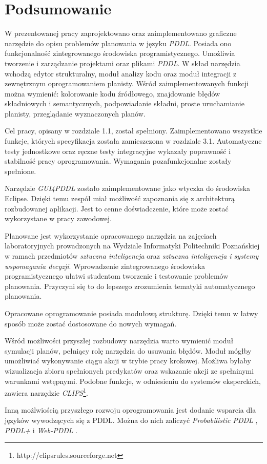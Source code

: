 \chapter{Podsumowanie}
\label{sec:podsumowanie}
W prezentowanej pracy zaprojektowano oraz zaimplementowano graficzne narzędzie do opisu problemów planowania
w języku \emph{PDDL}.
Posiada ono funkcjonalność zintegrowanego środowiska programistycznego. Umożliwia tworzenie i zarządzanie
projektami oraz plikami \emph{PDDL}. W skład narzędzia wchodzą edytor strukturalny, moduł analizy kodu oraz moduł
integracji z zewnętrznym oprogramowaniem planisty. Wśród zaimplementowanych funkcji można wymienić: kolorowanie kodu źródłowego, znajdowanie błędów składniowych i semantycznych,
podpowiadanie składni, proste uruchamianie planisty, przeglądanie wyznaczonych planów.

Cel pracy, opisany w rozdziale 1.1, został spełniony. Zaimplementowano wszystkie funkcje, których specyfikacja
została zamieszczona w rozdziale 3.1. Automatyczne testy jednostkowe oraz ręczne testy integracyjne wykazały
poprawność i stabilność pracy oprogramowania. Wymagania pozafunkcjonalne zostały spełnione.

Narzędzie \emph{GUI4PDDL} zostało zaimplementowane jako wtyczka do środowiska Eclipse. Dzięki temu 
zespół miał możliwość zapoznania się z architekturą rozbudowanej aplikacji. Jest to cenne doświadczenie,
które może zostać wykorzystane w pracy zawodowej.

Planowane jest wykorzystanie opracowanego narzędzia na zajęciach laboratoryjnych prowadzonych na Wydziale 
Informatyki Politechniki Poznańskiej w ramach przedmiotów \emph{sztuczna inteligencja} oraz \emph{sztuczna inteligencja i systemy wspomagania decyzji}.
Wprowadzenie zintegrowanego środowiska programistycznego
ułatwi studentom tworzenie i testowanie problemów planowania. Przyczyni się to do lepszego zrozumienia tematyki
automatycznego planowania.

Opracowane oprogramowanie posiada modułową strukturę. Dzięki temu w łatwy sposób może zostać dostosowane do 
nowych wymagań.

Wśród możliwości przyszłej rozbudowy narzędzia warto wymienić moduł symulacji planów, pełniący rolę narzędzia
do usuwania błędów. Moduł mógłby umożliwiać wykonywanie ciągu akcji w trybie pracy krokowej.
Możliwa byłaby wizualizacja zbioru spełnionych predykatów oraz wskazanie akcji ze spełninymi warunkami wstępnymi.
Podobne funkcje, w odniesieniu do systemów eksperckich, zawiera narzędzie \emph{CLIPS}\footnote{http://clipsrules.sourceforge.net}.

Inną możlwiością przyszłego rozwoju oprogramowania jest dodanie wsparcia dla języków wywodzących się z PDDL.
Można do nich zaliczyć \emph{Probabilistic PDDL} \cite{ppddl}, \emph{PDDL+} \cite{pddlplus} i \emph{Web-PDDL}
\cite{webpddl}. 

